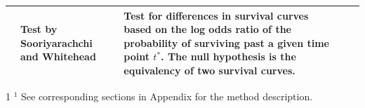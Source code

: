 \documentclass{article}
\begin{document}
\begin{center}
\begin{landscape}
\begin{table}[!htbpt!]
\begin{tabulary}{\linewidth} {|L|L|L|L|L|}
& Test by Sooriyarachchi and Whitehead & Test for differences in survival curves based on the log odds ratio of the probability of surviving past a given time point $t^*$. The null hypothesis is the equivalency of two survival curves. &  \\
\hline
\end{tabulary}
\begin{tablenotes}
\item [1] $^1$ See corresponding sections in Appendix for the method description.
\end{tablenotes}
\end{table}
\end{landscape}
\end{center}
\newpage



\end{document}
